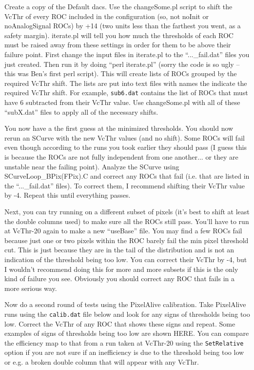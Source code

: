Create a copy of the Default dacs.  Use the changeSome.pl script to shift
the VcThr of every ROC included in the configuration (so, not noInit or noAnalogSignal ROCs)
by +14 (two units less than the farthest you went, as a safety margin).  
iterate.pl will tell you how much the thresholds of each ROC must be raised
away from these settings in order for them to be above their failure point.  First change
the input files in iterate.pl to the ``...\_fail.dat'' files you just created.  Then
run it by doing ``perl iterate.pl'' (sorry the code is so ugly -- this was Ben's first perl script). 
This will create lists of ROCs grouped by the
required VcThr shift.  The lists are put into text files with names the indicate 
the required VcThr shift.  For example, \verb|sub6.dat| contains the list of ROCs that
must have 6 subtracted from their VcThr value.  Use changeSome.pl with all of these ``subX.dat''
files to apply all of the necessary shifts.

You now have a the first guess at the minimized thresholds.  You should now rerun
an SCurve with the new VcThr values (and no shift).  Some ROCs will fail even though
according to the runs you took earlier they should pass (I guess this is because the 
ROCs are not fully independent from one another... or they are unstable near the failing point).
Analyze the SCurve using SCurveLoop\_BPix(FPix).C and correct any ROCs that fail (i.e. that 
are listed in the ``...\_fail.dat'' files).  To correct them, I recommend shifting their
VcThr value by -4.  Repeat this until everything passes. 

Next, you can try running on a different subset of pixels (it's best to
shift at least the double columns used) to make sure all the ROCs
still pass.  You'll have to run at VcThr-20 again to make a new ``useBase'' file.
You may find a few ROCs fail because just one or two pixels within the ROC barely
fail the min pixel threshold cut.  This is just because they are in the tail of the 
distribution and is not an indication of the threshold being too low.  You can 
correct their VcThr by -4, but I wouldn't recommend doing this for more and more
subsets if this is the only kind of failure you see.  Obviously you should correct
any ROC that fails in a more serious way.

Now do a second round of tests using the PixelAlive calibration.  Take 
PixelAlive runs using the \verb|calib.dat| file below and look for 
any signs of thresholds being too low.  Correct the VcThr of any 
ROC that shows these signs and repeat.  Some examples of signs
of thresholds being too low are shown HERE. You can compare the 
efficiency map to that from a run taken at VcThr-20 using the 
\verb|SetRelative| option if you are not sure if 
an inefficiency is due to the threshold being too low or
e.g. a broken double column that will appear with any VcThr.


